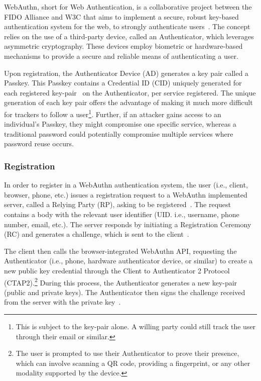 
\newcommand{\credIdentifier}{\footnote{There is a requirement to check whether the credential identifier, generated by the Authenticator
device exsits on the server.
For further discussions on this topic, see section \hyperref[sec:futurework]{Future work}}}

\newcommand{\navigatorApi}{\footnote{In LessPM's case, this is the \textit{navigator.credentials} API provided by the browser.}}


WebAuthn, short for Web Authentication, is a collaborative project between the
FIDO Alliance and W3C that aims to implement a secure, robust key-based
authentication system for the web, to strongly authenticate users~\cite{webauthn_level_2}.
The concept relies on the use of a third-party device, called an Authenticator,
which leverages asymmetric cryptography.
These devices employ biometric or hardware-based mechanisms to provide a secure
and reliable means of authenticating a user.

Upon registration, the Authenticator Device (AD) generates a key pair called a
Passkey.
This Passkey contains a Credential ID (CID) uniquely generated for each
registered key-pair~\cite{webauthn_credential_id,webauthn_public_key_credential}
on the Authenticator, per service registered.
The unique generation of each key pair offers the advantage of making it much
more difficult for trackers to follow a user\footnote{
  This is subject to the key-pair alone. A willing party could still track the
  user through their email or similar.
}.
Further, if an attacker gains access to an individual's Passkey, they might
compromise one specific service, whereas a traditional password could
potentially compromise multiple services where password reuse occurs\cite{wang2018next}.

\subsubsection{Registration}\label{subsubsec:registration}
In order to register in a WebAuthn authentication system, the user (i.e.,
client, browser, phone, etc.) issues a registration request to a
WebAuthn implemented server, called a Relying Party (RP), asking to be
registered~\cite{webauthn-2-rp}.
The request contains a body with the relevant user identifier (UID. i.e.,
username, phone number, email, etc.).
The server responds by initiating a Registration Ceremony (RC) and generates a
challenge, which is sent to the client~\cite{webauthn-2}.

The client then calls the browser-integrated WebAuthn API, requesting the
Authenticator (i.e., phone, hardware authenticator device, or similar)
to create a new public key credential through the Client to Authenticator 2
Protocol (CTAP2).\footnote{
  The user is prompted to use their Authenticator to prove their presence, which can involve scanning a QR code,
  providing a fingerprint, or any other modality supported by the device.}
During this process, the Authenticator generates a new key-pair (public and
private keys).
The Authenticator then signs the challenge received from the server with the
private key~\cite{webauthn-2-registering}.

